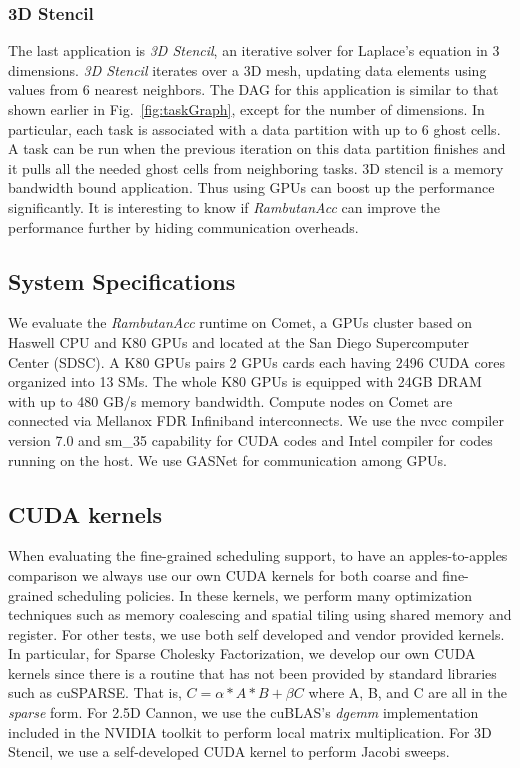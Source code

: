 \subsubsection{3D Stencil}
The last application is {\em 3D Stencil}, an iterative solver for Laplace's equation in 3 dimensions.
{\em 3D Stencil} iterates over a 3D mesh, updating data elements using values from 6 nearest neighbors.
The DAG for this application is similar to that shown earlier in Fig.~\ref{fig:taskGraph}, except for the number of dimensions.
In particular, each task is associated with a data partition with up to 6 ghost cells.
A task can be run when the previous iteration on this data partition finishes and it pulls all the needed ghost cells from neighboring tasks.
3D stencil is a memory bandwidth bound application. 
Thus using GPUs can boost up the performance significantly.
It is interesting to know if {\em RambutanAcc} can improve the performance further by  hiding communication overheads.


\subsection{System Specifications}
We evaluate the {\em RambutanAcc} runtime on Comet, a GPUs cluster based on Haswell CPU and K80 GPUs and located at the San Diego Supercomputer Center (SDSC).
A K80 GPUs pairs 2 GPUs cards each having 2496 CUDA cores organized into 13 SMs.
The whole K80 GPUs is equipped with 24GB DRAM with up to 480 GB/s memory bandwidth.
Compute nodes on Comet are connected via Mellanox FDR Infiniband interconnects.
We use the nvcc compiler version 7.0 and sm\_35 capability for CUDA codes and Intel compiler for codes running on the host.
We use GASNet for communication among GPUs. 


\subsection{CUDA kernels}
When evaluating the fine-grained scheduling support, to have an apples-to-apples comparison we always use our own CUDA kernels for both coarse and fine-grained scheduling policies.
In these kernels, we perform many optimization techniques such as memory coalescing and spatial tiling using shared memory and register.
For other tests, we use both self developed and vendor provided kernels.
In particular, for Sparse Cholesky Factorization, we develop our own CUDA kernels since there is a routine that has not been provided by standard libraries such as cuSPARSE.
That is, $C = \alpha* A * B + \beta C$ where A, B, and C are all in the {\em sparse} form.
For 2.5D Cannon, we use the cuBLAS's {\em dgemm} implementation included in the NVIDIA toolkit to perform local matrix multiplication.
For 3D Stencil, we use a self-developed CUDA kernel to perform Jacobi sweeps.

